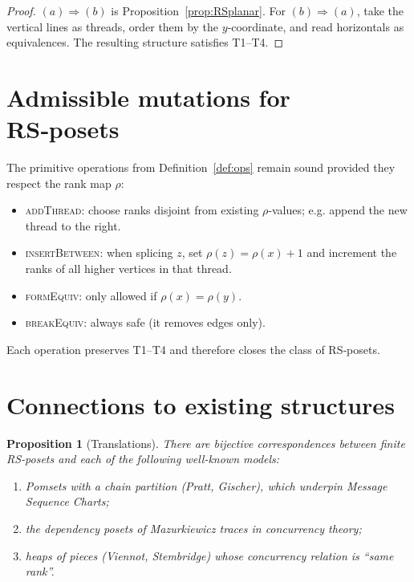 \documentclass{article}
\newtheorem{proposition}{Proposition}
\begin{document}
\begin{proof}
$(a)\Rightarrow(b)$ is Proposition~\ref{prop:RSplanar}.  For
$(b)\Rightarrow(a)$, take the vertical lines as threads, order them by
the $y$‑coordinate, and read horizontals as equivalences.  The
resulting structure satisfies T1--T4.
\end{proof}

\section{Admissible mutations for RS‑posets}

The primitive operations from Definition~\ref{def:ops} remain sound
provided they respect the rank map $\rho$:
\begin{itemize}
  \item \textsc{addThread}: choose ranks disjoint from existing
        $\rho$‑values; e.g. append the new thread to the right.
  \item \textsc{insertBetween}: when splicing $z$, set
        $\rho(z)=\rho(x)+1$ and increment the ranks of all higher
        vertices in that thread.
  \item \textsc{formEquiv}: only allowed if $\rho(x)=\rho(y)$.
  \item \textsc{breakEquiv}: always safe (it removes edges only).
\end{itemize}
Each operation preserves T1--T4 and therefore closes the class of
RS‑posets.

\section{Connections to existing structures}\label{sec:related}

\begin{proposition}[Translations]
There are bijective correspondences between finite RS‑posets and each
of the following well‑known models:
\begin{enumerate}[label=\textup{(\roman*)}]
  \item \emph{Pomsets with a chain partition} (Pratt, Gischer), which
        underpin Message Sequence Charts;
  \item the dependency posets of \emph{Mazurkiewicz traces} in
        concurrency theory;
  \item \emph{heaps of pieces} (Viennot, Stembridge) whose concurrency
        relation is ``same rank''.
\end{enumerate}
\end{proposition}
\end{document}
